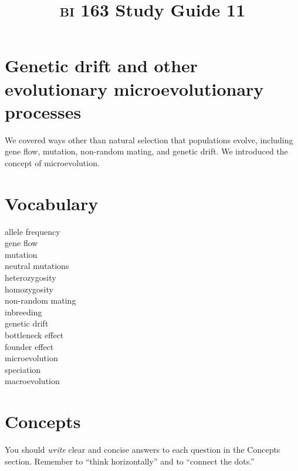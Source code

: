 \documentclass[letterpaper]{tufte-handout}
\title{{\scshape bi} 163 Study Guide 11}
\date{} %
\begin{document}
\maketitle	%

\section*{Genetic drift and other evolutionary microevolutionary processes}

We covered ways other than natural selection that populations evolve, including gene flow, mutation, non-random mating, and genetic drift. We introduced the concept of microevolution.

\section*{Vocabulary}

\vspace{-1\baselineskip}
\begin{multicols}{2}
allele frequency \\
gene flow \\
mutation \\
neutral mutations \\
heterozygosity \\
homozygosity \\
non-random mating \\
inbreeding \\
genetic drift \\
bottleneck effect \\
founder effect \\
microevolution \\
speciation \\
macroevolution

\end{multicols}

\section*{Concepts}

You should \emph{write} clear and concise answers to each question in the Concepts section.  Remember to ``think horizontally'' and to ``connect the dots.'' 
\end{document}
